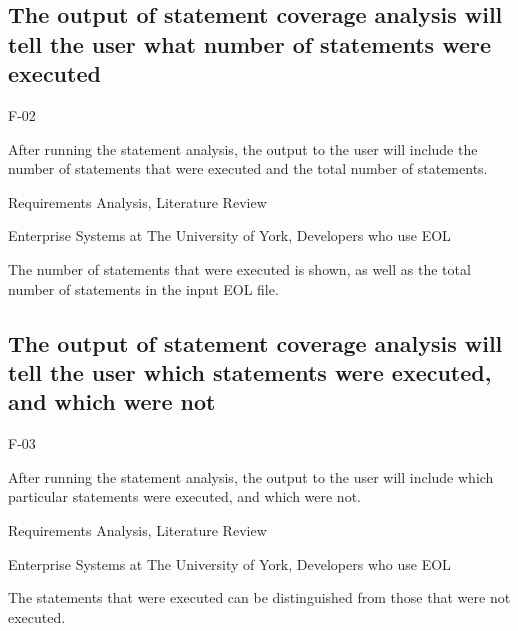\subsection{The output of statement coverage analysis will tell the user what number of statements were executed}
\begin{description}[style=sameline,leftmargin=4.5cm,nolistsep]
\item[\hspace*{0.3cm}Label] F-02
\item[\hspace*{0.3cm}Description] After running the statement analysis, the output to the user will include the number of statements that were executed and the total number of statements.
\item[\hspace*{0.3cm}Source] Requirements Analysis, Literature Review
\item[\hspace*{0.3cm}Stakeholders] Enterprise Systems at The University of York, Developers who use EOL
\item[\hspace*{0.3cm}Satisfiable Conditions] The number of statements that were executed is shown, as well as the total number of statements in the input EOL file.
\end{description}

\subsection{The output of statement coverage analysis will tell the user which statements were executed, and which were not}
\begin{description}[style=sameline,leftmargin=4.5cm,nolistsep]
\item[\hspace*{0.3cm}Label] F-03
\item[\hspace*{0.3cm}Description] After running the statement analysis, the output to the user will include which particular statements were executed, and which were not.
\item[\hspace*{0.3cm}Source] Requirements Analysis, Literature Review
\item[\hspace*{0.3cm}Stakeholders] Enterprise Systems at The University of York, Developers who use EOL
\item[\hspace*{0.3cm}Satisfiable Conditions] The statements that were executed can be distinguished from those that were not executed.
\end{description}

